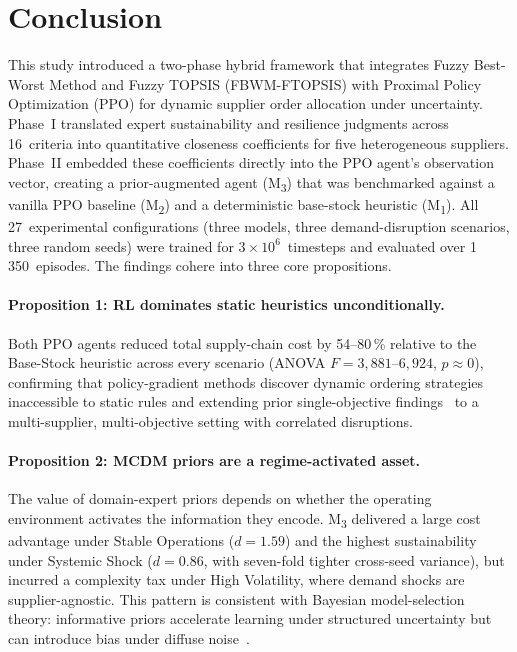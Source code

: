 \documentclass[preprint,12pt]{elsarticle}
\begin{document}
\section{Conclusion}
\label{sec:conclusion}

This study introduced a two-phase hybrid framework that integrates Fuzzy Best-Worst Method and Fuzzy TOPSIS (FBWM-FTOPSIS) with Proximal Policy Optimization (PPO) for dynamic supplier order allocation under uncertainty.
Phase~I translated expert sustainability and resilience judgments across 16~criteria into quantitative closeness coefficients for five heterogeneous suppliers.
Phase~II embedded these coefficients directly into the PPO agent's observation vector, creating a prior-augmented agent (M\textsubscript{3}) that was benchmarked against a vanilla PPO baseline (M\textsubscript{2}) and a deterministic base-stock heuristic (M\textsubscript{1}).
All 27~experimental configurations (three models, three demand-disruption scenarios, three random seeds) were trained for $3\!\times\!10^{6}$~timesteps and evaluated over 1\,350~episodes.
The findings cohere into three core propositions.


\paragraph{Proposition 1: RL dominates static heuristics unconditionally.}
Both PPO agents reduced total supply-chain cost by 54--80\,\% relative to the Base-Stock heuristic across every scenario (ANOVA $F = 3{,}881$--$6{,}924$, $p \approx 0$), confirming that policy-gradient methods discover dynamic ordering strategies inaccessible to static rules and extending prior single-objective findings~\citep{Wang_etal_2022,Li_etal_2024} to a multi-supplier, multi-objective setting with correlated disruptions.

\paragraph{Proposition 2: MCDM priors are a regime-activated asset.}
The value of domain-expert priors depends on whether the operating environment activates the information they encode.
M\textsubscript{3} delivered a large cost advantage under Stable Operations ($d = 1.59$) and the highest sustainability under Systemic Shock ($d = 0.86$, with seven-fold tighter cross-seed variance), but incurred a complexity tax under High Volatility, where demand shocks are supplier-agnostic.
This pattern is consistent with Bayesian model-selection theory: informative priors accelerate learning under structured uncertainty but can introduce bias under diffuse noise~\citep{Chen_Kumar_2024}.
\end{document}
